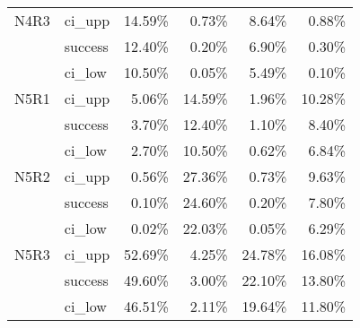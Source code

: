 \begin{tabular}{llrrrr}
N4R3 & ci\_upp &      14.59\% &  0.73\% &        8.64\% &  0.88\% \\
     & success &      12.40\% &  0.20\% &        6.90\% &  0.30\% \\
     & ci\_low &      10.50\% &  0.05\% &        5.49\% &  0.10\% \\
N5R1 & ci\_upp &       5.06\% & 14.59\% &        1.96\% & 10.28\% \\
     & success &       3.70\% & 12.40\% &        1.10\% &  8.40\% \\
     & ci\_low &       2.70\% & 10.50\% &        0.62\% &  6.84\% \\
N5R2 & ci\_upp &       0.56\% & 27.36\% &        0.73\% &  9.63\% \\
     & success &       0.10\% & 24.60\% &        0.20\% &  7.80\% \\
     & ci\_low &       0.02\% & 22.03\% &        0.05\% &  6.29\% \\
N5R3 & ci\_upp &      52.69\% &  4.25\% &       24.78\% & 16.08\% \\
     & success &      49.60\% &  3.00\% &       22.10\% & 13.80\% \\
     & ci\_low &      46.51\% &  2.11\% &       19.64\% & 11.80\% \\
\bottomrule
\end{tabular}

